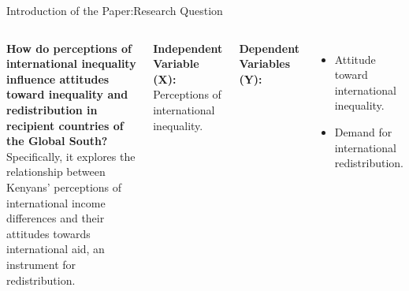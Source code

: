 \documentclass[aspectratio=169,10pt,compress]{beamer}
\begin{document}
\begin{frame}{Introduction of the Paper:Research Question}
  \begin{columns}[onlytextwidth,T]
    \hspace*{1cm} %
    \begin{minipage}{\dimexpr\textwidth-2cm} %
    \vspace{1cm} %
    \textbf{How do perceptions of international inequality influence attitudes toward inequality and redistribution in recipient countries of the Global South? }Specifically, it explores the relationship between Kenyans' perceptions of international income differences and their attitudes towards international aid, an instrument for redistribution.

    \vspace{3mm} %
    \textbf{Independent Variable (X):} Perceptions of international inequality.

    \vspace{3mm} %
    \textbf{Dependent Variables (Y):}
    \begin{itemize}
      \item Attitude toward international inequality.
      \item Demand for international redistribution.
    \end{itemize}
    \vspace{1cm} %
    \end{minipage}

    \vfill %
    \setlength{\fboxrule}{0.5pt} %
    \setlength{\fboxsep}{2pt} %
    \vspace*{1cm} %
  \end{columns}
\end{frame}
\end{document}
